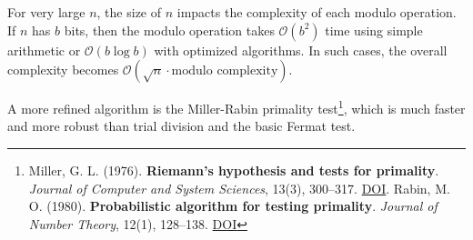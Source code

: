 \documentclass[
  letterpaper,
  DIV=11,
  numbers=noendperiod,
  oneside]{scrartcl}
\begin{document}
For very large \(n\), the size of \(n\) impacts the complexity of each
modulo operation. If \(n\) has \(b\) bits, then the modulo operation
takes \(\mathcal{O}(b^2)\) time using simple arithmetic or
\(\mathcal{O}(b \log b)\) with optimized algorithms. In such cases, the
overall complexity becomes
\(\mathcal{O}(\sqrt{n} \cdot \text{modulo complexity})\).

A more refined algorithm is the Miller-Rabin primality test\footnote{Miller,
  G. L. (1976). \textbf{Riemann's hypothesis and tests for primality}.
  \emph{Journal of Computer and System Sciences}, 13(3), 300--317.
  \href{https://doi.org/10.1016/S0022-0000(76)80043-8}{DOI}. Rabin, M.
  O. (1980). \textbf{Probabilistic algorithm for testing primality}.
  \emph{Journal of Number Theory}, 12(1), 128--138.
  \href{https://doi.org/10.1016/0022-314X(80)90084-0}{DOI}}, which is
much faster and more robust than trial division and the basic Fermat
test.
\end{document}
